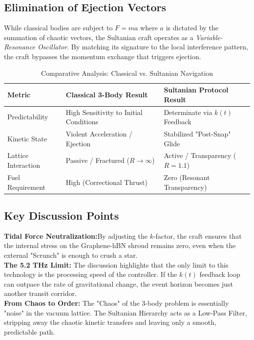 \documentclass[11pt]{article}
\begin{document}
\subsection{Elimination of Ejection Vectors}
While classical bodies are subject to $F = ma$ where $a$ is dictated by the summation of chaotic vectors, the Sultanian craft operates as a \textit{Variable-Resonance Oscillator}. By matching its signature to the local interference pattern, the craft bypasses the momentum exchange that triggers ejection.



\begin{table}[h]
\centering
\caption{Comparative Analysis: Classical vs. Sultanian Navigation}
\label{tab:comparison}
\begin{tabularx}{\textwidth}{@{} l X X @{}}
\toprule
\textbf{Metric} & \textbf{Classical 3-Body Result} & \textbf{Sultanian Protocol Result} \\ \midrule
Predictability & High Sensitivity to Initial Conditions & Determinate via $k(t)$ Feedback \\
Kinetic State & Violent Acceleration / Ejection & Stabilized "Post-Snap" Glide \\
Lattice Interaction & Passive / Fractured ($R \to \infty$) & Active / Transparency ($R = 1.1$) \\
Fuel Requirement & High (Correctional Thrust) & Zero (Resonant Transparency) \\ \bottomrule
\end{tabularx}
\end{table}

\subsection{Key Discussion Points}
\textbf{Tidal Force Neutralization:}By adjusting the $k$-factor, the craft ensures that the internal stress on the Graphene-hBN shroud remains zero, even when the external "Scrunch" is enough to crush a star.\\
\textbf{The 5.2 THz Limit:} The discussion highlights that the only limit to this technology is the processing speed of the controller. If the $k(t)$ feedback loop can outpace the rate of gravitational change, the event horizon becomes just another transit corridor.\\
\textbf{From Chaos to Order:} The "Chaos" of the 3-body problem is essentially "noise" in the vacuum lattice. The Sultanian Hierarchy acts as a Low-Pass Filter, stripping away the chaotic kinetic transfers and leaving only a smooth, predictable path.
\end{document}
